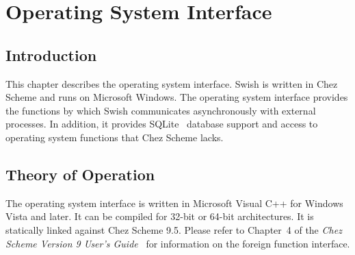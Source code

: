 %
%
%

\chapter {Operating System Interface}\label{chap:osi}

\section {Introduction}

This chapter describes the operating system interface. Swish is
written in Chez Scheme and runs on Microsoft Windows.  The operating
system interface provides the functions by which Swish communicates
asynchronously with external processes. In addition, it
provides SQLite~\cite{sqlite-guide} database support and access to
operating system functions that Chez Scheme lacks.

\section {Theory of Operation}

The operating system interface is written in Microsoft Visual C++ for
Windows Vista and later. It can be compiled for 32-bit or 64-bit
architectures. It is statically linked against Chez Scheme 9.5.
Please refer to Chapter~4 of the \emph{Chez Scheme Version 9 User's
  Guide}~\cite{chez-scheme-users-guide} for information on the foreign
function interface.

